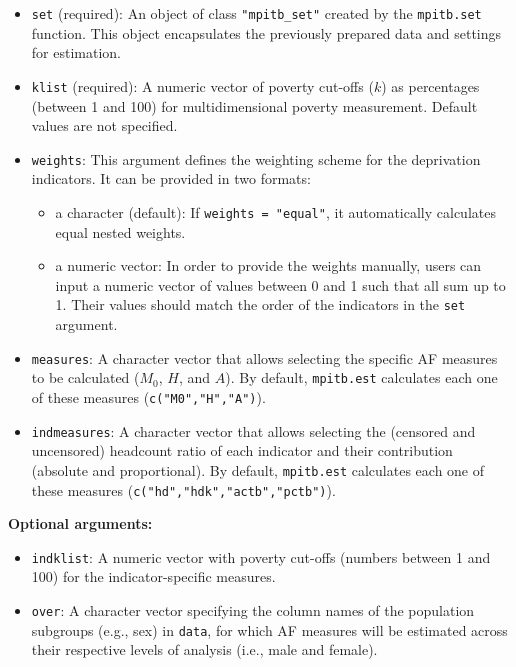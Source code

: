 \begin{itemize}
\item
  \texttt{set} (required): An object of class \texttt{"mpitb\_set"} created by the \texttt{mpitb.set} function. This object encapsulates the previously prepared data and settings for estimation.
\item
  \texttt{klist} (required): A numeric vector of poverty cut-offs (\(k\)) as percentages (between 1 and 100) for multidimensional poverty measurement. Default values are not specified.
\item
  \texttt{weights}: This argument defines the weighting scheme for the deprivation indicators. It can be provided in two formats:

  \begin{itemize}
  \item
    a character (default): If \texttt{weights\ =\ "equal"}, it automatically calculates equal nested weights.
  \item
    a numeric vector: In order to provide the weights manually, users can input a numeric vector of values between 0 and 1 such that all sum up to 1. Their values should match the order of the indicators in the \texttt{set} argument.
  \end{itemize}
\item
  \texttt{measures}: A character vector that allows selecting the specific AF measures to be calculated (\(M_0\), \(H\), and \(A\)). By default, \texttt{mpitb.est} calculates each one of these measures (\texttt{c("M0","H","A")}).
\item
  \texttt{indmeasures}: A character vector that allows selecting the (censored and uncensored) headcount ratio of each indicator and their contribution (absolute and proportional). By default, \texttt{mpitb.est} calculates each one of these measures (\texttt{c("hd","hdk","actb","pctb")}).
\end{itemize}

\textbf{Optional arguments:}

\begin{itemize}
\item
  \texttt{indklist}: A numeric vector with poverty cut-offs (numbers between 1 and 100) for the indicator-specific measures.
\item
  \texttt{over}: A character vector specifying the column names of the population subgroups (e.g., sex) in \texttt{data}, for which AF measures will be estimated across their respective levels of analysis (i.e., male and female).
\end{itemize}

